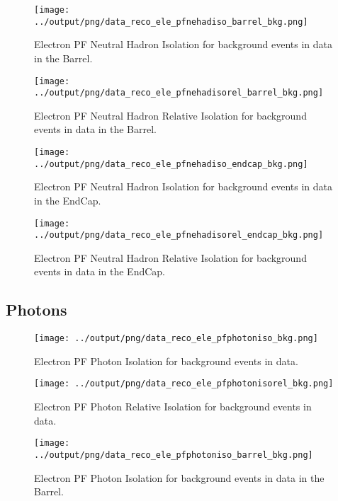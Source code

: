 \documentclass[11pt]{book}
\begin{document}
\begin{figure}[htb]
\centering
\texttt{[image: ../output/png/data\_reco\_ele\_pfnehadiso\_barrel\_bkg.png]}
\caption{Electron PF Neutral Hadron Isolation for background events in data in the Barrel.}
\label{fig:data_ele_pfnehadiso_barrel_bkg}
\end{figure}

\begin{figure}[htb]
\centering
\texttt{[image: ../output/png/data\_reco\_ele\_pfnehadisorel\_barrel\_bkg.png]}
\caption{Electron PF Neutral Hadron Relative Isolation for background events in data in the Barrel.}
\label{fig:data_ele_pfnehadisorel_barrel_bkg}
\end{figure}

\begin{figure}[htb]
\centering
\texttt{[image: ../output/png/data\_reco\_ele\_pfnehadiso\_endcap\_bkg.png]}
\caption{Electron PF Neutral Hadron Isolation for background events in data in the EndCap.}
\label{fig:data_ele_pfnehadiso_endcap_bkg}
\end{figure}

\begin{figure}[htb]
\centering
\texttt{[image: ../output/png/data\_reco\_ele\_pfnehadisorel\_endcap\_bkg.png]}
\caption{Electron PF Neutral Hadron Relative Isolation for background events in data in the EndCap.}
\label{fig:data_ele_pfnehadisorel_endcap_bkg}
\end{figure}
\clearpage

\subsection{Photons}
\begin{figure}[htb]
\centering
\texttt{[image: ../output/png/data\_reco\_ele\_pfphotoniso\_bkg.png]}
\caption{Electron PF Photon Isolation for background events in data.}
\label{fig:data_ele_pfphotoniso_bkg}
\end{figure}

\begin{figure}[htb]
\centering
\texttt{[image: ../output/png/data\_reco\_ele\_pfphotonisorel\_bkg.png]}
\caption{Electron PF Photon Relative Isolation for background events in data.}
\label{fig:data_ele_pfphotonisorel_bkg}
\end{figure}

\begin{figure}[htb]
\centering
\texttt{[image: ../output/png/data\_reco\_ele\_pfphotoniso\_barrel\_bkg.png]}
\caption{Electron PF Photon Isolation for background events in data in the Barrel.}
\label{fig:data_ele_pfphotoniso_barrel_bkg}
\end{figure}
\end{document}

